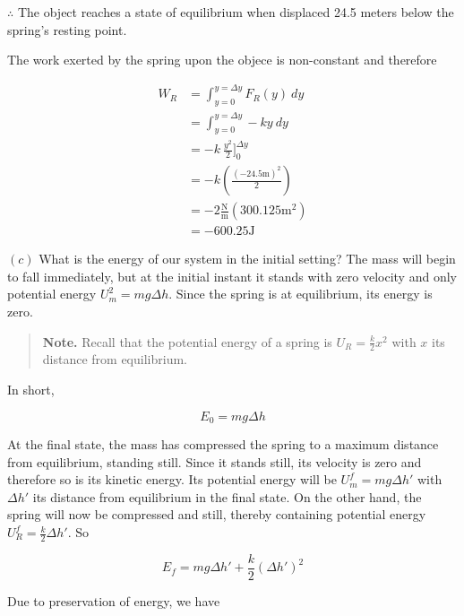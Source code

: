 \documentclass[12pt]{article}
\theoremstyle{definition}
\begin{document}
$\therefore $ The object reaches a state of equilibrium when displaced 24.5
meters below the spring's resting point.

The work exerted by the spring upon the objece is non-constant and therefore 

\begin{align*}
    W_R &= \int_{y=0}^{y=\Delta y} F_R(y) ~ dy \\ 
        &= \int_{y=0}^{y = \Delta y} -ky ~ dy \\ 
        &= -k ~ \frac{y^2}{2}\Big]_{0}^{\Delta y} \\ 
        &= -k \left( \frac{( -24.5\text{m} )^2}{2}\right)  \\ 
        &= -2 \frac{\text{N}}{\text{m}} (300.125\text{m}^2) \\ 
        &= -600.25 \text{J}
\end{align*}

$(c)$ What is the energy of our system in the initial setting? The mass will
begin to fall immediately, but at the initial instant it stands with zero
velocity and only potential energy $U_m^2 = mg \Delta h$. Since the spring is at
equilibrium, its energy is zero.


\small
\begin{quote}

\textbf{Note.} Recall that the potential energy of a spring is $U_R =
\frac{k}{2} x^2$ with $x$ its distance from equilibrium.

\end{quote}
\normalsize

In short, 

\begin{equation*}
    E_0 = mg \Delta h
\end{equation*}

At the final state, the mass has compressed the spring to a maximum distance
from equilibrium, standing still. Since it stands still, its velocity is zero
and therefore so is its kinetic energy. Its potential energy will be 
$U_m^f = mg \Delta h'$ with $\Delta h'$ its distance from equilibrium in the
final state. On the other hand, the spring will now be compressed and still,
thereby containing potential energy $U_R^f = \frac{k}{2}\Delta h'$. So 

\begin{equation*}
    E_f = mg\Delta h' + \frac{k}{2}( \Delta h' )^2
\end{equation*}

Due to preservation of energy, we have 
\end{document}
